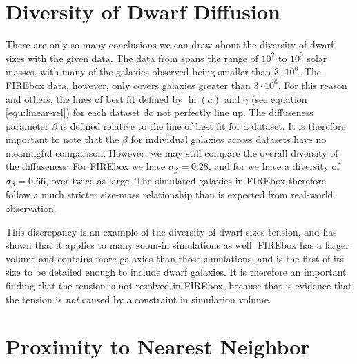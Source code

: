 \section{Diversity of Dwarf Diffusion}

% 
There are only so many conclusions we can draw about the diversity of dwarf sizes with the given data. The data from \cite{mcconnachieOBSERVEDPROPERTIESDWARF2012} spans the range of $10^2$ to $10^9$ solar masses, with many of the galaxies observed being smaller than $3 \cdot 10^6$. The FIREbox data, however, only covers galaxies greater than $3 \cdot 10^6$. For this reason and others, the lines of best fit defined by $\ln(a)$ and $\gamma$ (see equation \ref{equ:linear-rel}) for each dataset do not perfectly line up. %
The diffuseness parameter $\beta$ is defined relative to the line of best fit for a dataset. It is therefore important to note that the $\beta$ for individual galaxies across datasets have no meaningful comparison. However, we may still compare the overall diversity of the diffuseness. For FIREbox we have $\sigma_\beta = 0.28$, and for \cite{mcconnachieOBSERVEDPROPERTIESDWARF2012} we have a diversity of $\sigma_\beta = 0.66$, over twice as large. The simulated galaxies in FIREbox therefore follow a much stricter size-mass relationship than is expected from real-world observation.

This discrepancy is an example of the diversity of dwarf sizes tension, and \cite{salesBaryonicSolutionsChallenges2022} has shown that it applies to many zoom-in simulations as well. FIREbox has a larger volume and contains more galaxies than those simulations, and is the first of its size to be detailed enough to include dwarf galaxies. It is therefore an important finding that the tension is not resolved in FIREbox, because that is evidence that the tension is \emph{not} caused by a constraint in simulation volume.

\section{Proximity to Nearest Neighbor}